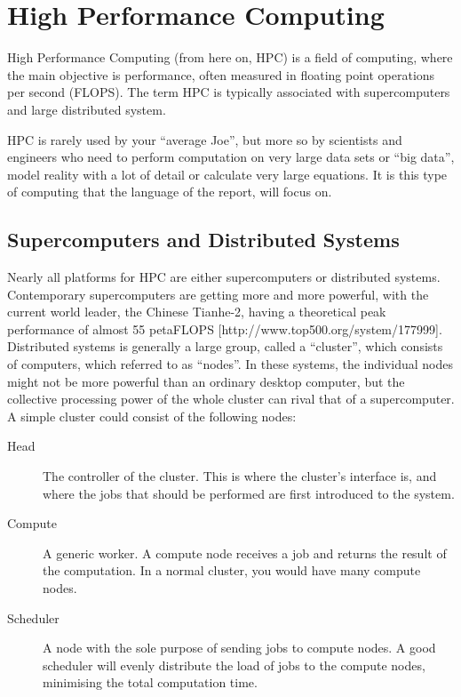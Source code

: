 \section{High Performance Computing}

High Performance Computing (from here on, HPC) is a field of computing, where the main objective is performance, often measured in floating point operations per second (FLOPS). The term HPC is typically associated with supercomputers and large distributed system. 

HPC is rarely used by your \enquote{average Joe}, but more so by scientists and engineers who need to perform computation on very large data sets or \enquote{big data}, model reality with a lot of detail or calculate very large equations. It is this type of computing that the language of the report, will focus on.


\subsection{Supercomputers and Distributed Systems}

Nearly all platforms for HPC are either supercomputers or distributed systems. Contemporary supercomputers are getting more and more powerful, with the current world leader, the Chinese Tianhe-2, having a theoretical peak performance of almost 55 petaFLOPS [http://www.top500.org/system/177999].
Distributed systems is generally a large group, called a \enquote{cluster}, which consists of computers, which referred to as \enquote{nodes}. In these systems, the individual nodes might not be more powerful than an ordinary desktop computer, but the collective processing power of the whole cluster can rival that of a supercomputer.
A simple cluster could consist of the following nodes:
\begin{description}
	\item [Head]
	The controller of the cluster. This is where the cluster's interface is, and where the jobs that should be performed are first introduced to the system.
	\item [Compute]
	A generic worker. A compute node receives a job and returns the result of the computation. In a normal cluster, you would have many compute nodes.
	\item [Scheduler]
	A node with the sole purpose of sending jobs to compute nodes. A good scheduler will evenly distribute the load of jobs to the compute nodes, minimising the total computation time.
\end{description}

